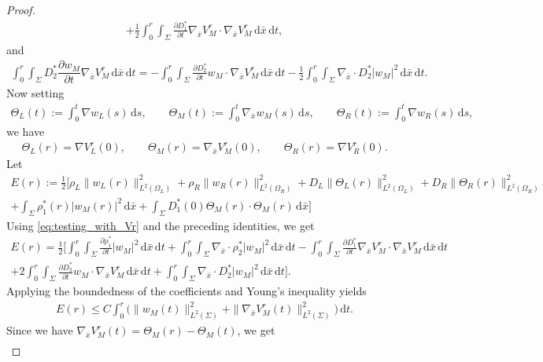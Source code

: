 \documentclass[11pt]{article}
\def\mor{\Omega_R}
\def\mol{\Omega_L}
\def\p{\partial}
\newcommand{\di}[1]{\,\mathrm{d}#1}
\begin{document}
\begin{proof}
\begin{multline*}
    +\frac12  \int_0^r\int_{\Sigma}\frac{\p D_1^*}{\p t} \nabla_{\bar x}V_M^r\cdot \nabla_{\bar x}V_M^r\di{\bar x}\di{t},
\end{multline*}
and
\begin{align*}
    \int_0^r\int_{\Sigma}D_2^*\dfrac{\partial w_M}{\partial t}\nabla_{\bar x}V^r_M\di{\bar x}\di{t}=-\int_0^r\int_{\Sigma}\frac{\p D_2^*}{\p t}w_M \cdot \nabla_{\bar x}V^r_M \di{\bar x}\di{t}-\frac12 \int_0^r\int_{\Sigma}\nabla_{\bar x}\cdot D_2^*|w_M|^2\di{\bar x}\di{t}.
\end{align*}
Now setting
\begin{align*}
    \Theta_L(t):=\int_0^t\nabla w_L (s) \di{s},\qquad  \Theta_M(t):=\int_0^t\nabla_{\bar x} w_M (s) \di{s},\qquad  \Theta_R(t):=\int_0^t\nabla w_R (s) \di{s},
\end{align*}
we have
\begin{align*}
    \Theta_L(r)=\nabla V^r_L(0), \qquad  \Theta_M(r)=\nabla_{\bar x}V^r_M(0), \qquad  \Theta_R(r)=\nabla V^r_R(0).
\end{align*}
Let 
\begin{multline*}
    E(r):=\frac12\Bigg[\rho_L\|w_L(r)\|_{L^2(\mol)}^2+\rho_R\|w_R(r)\|_{L^2(\mor)}^2+ D_L\| \Theta_L(r)\|_{L^2(\mol)}^2+D_R\|\Theta_R(r)\|_{L^2(\mor)}^2\\
    +\int_\Sigma \rho_{1}^*(r)|w_M(r)|^2\di{\bar x}+\int_\Sigma D_1^*(0)\Theta_M(r)\cdot \Theta_M(r)\di{\bar x}\Bigg]
\end{multline*}
Using \eqref{eq:testing_with_Vr} and the preceding identities, we get
\begin{multline*}
    E(r)=\frac12\Bigg[ \int_0^r\int_\Sigma \frac{\p \rho_{1}^*}{\p t} |w_M|^2\di{\bar x}\di{t}+\int_0^r \int_{\Sigma} \nabla_{\bar x}\cdot \rho_{2}^*|w_M|^2\di{\bar x}\di{t}- \int_0^r\int_{\Sigma}\frac{\p D_1^*}{\p t} \nabla_{\bar x}V_M^r\cdot \nabla_{\bar x}V_M^r\di{\bar x}\di{t}\\
    +2\int_0^r\int_{\Sigma}\frac{\p D_2^*}{\p t}w_M \cdot \nabla_{\bar x}V^r_M \di{\bar x}\di{t}+ \int_0^r\int_{\Sigma}\nabla_{\bar x}\cdot D_2^*|w_M|^2\di{\bar x}\di{t}\Bigg].
\end{multline*}
Applying the boundedness of the coefficients and Young's inequality yields
\begin{align*}
    E(r)\leq C \int_0^r\Big(\|w_M(t)\|_{L^2(\Sigma)}^2+\|\nabla_{\bar x}V_M^r(t)\|_{L^2(\Sigma)}^2\Big)\di{t}.
\end{align*}
Since we have $\nabla_{\bar x}V_M^r(t)=\Theta_M(r)-\Theta_M(t)$, we get
\begin{align*}

\end{align*}
\end{proof}
\end{document}
